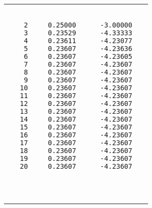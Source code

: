 \documentclass{article}
\begin{document}
\begin{tabular}{|p{10cm}|}
  \begin{verbatim}
   
    2     0.25000      -3.00000
    3     0.23529      -4.33333
    4     0.23611      -4.23077
    5     0.23607      -4.23636
    6     0.23607      -4.23605
    7     0.23607      -4.23607
    8     0.23607      -4.23607
    9     0.23607      -4.23607
   10     0.23607      -4.23607
   11     0.23607      -4.23607
   12     0.23607      -4.23607
   13     0.23607      -4.23607
   14     0.23607      -4.23607
   15     0.23607      -4.23607
   16     0.23607      -4.23607
   17     0.23607      -4.23607
   18     0.23607      -4.23607
   19     0.23607      -4.23607
   20     0.23607      -4.23607   
   
   
   
  \end{verbatim}
\end{tabular}
\end{document}
